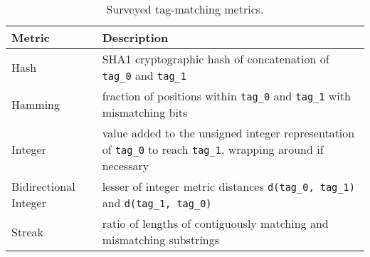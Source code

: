 \begin{table*}[!htbp]
\begin{tabularx}{\textwidth}{l|X}
\textbf{Metric}       & \textbf{Description}                                                                                                                                        \\ \hline
Hash                  & SHA1 cryptographic hash of  concatenation of \texttt{tag\_0} and \texttt{tag\_1} \citep{eastlake2001us}                         \\ \hline
Hamming               & fraction of positions within \texttt{tag\_0} and \texttt{tag\_1} with mismatching bits                                                                         \\ \hline
Integer               & value added to the unsigned integer representation of \texttt{tag\_0} to reach \texttt{tag\_1}, wrapping around if necessary \\ \hline
Bidirectional Integer & lesser of integer metric distances \texttt{d(tag\_0, tag\_1)} and \texttt{d(tag\_1, tag\_0)}                                                                \\ \hline
Streak                & ratio of lengths of contiguously matching and mismatching substrings \\ \hline
\end{tabularx}


\caption{
Surveyed tag-matching metrics.
}
\label{tab:metrics}
\vspace{-6ex}
\end{table*}

